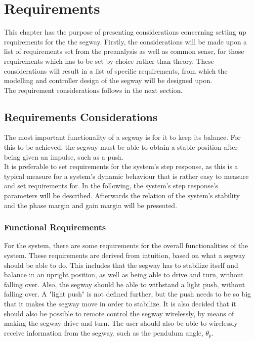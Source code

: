 \chapter{Requirements}
This chapter has the purpose of presenting considerations concerning setting up requirements for the the segway. Firstly, the considerations will be made upon a list of requirements set from the preanalysis as well as common sense, for those requirements which has to be set by choice rather than theory. These considerations will result in a list of specific requirements, from which the modelling and controller design of the segway will be designed upon. \\
The requirement considerations follows in the next section.
\section{Requirements Considerations}
The most important functionality of a segway is for it to keep its balance. For this to be achieved, the segway must be able to obtain a stable position after being given an impulse, such as a push. \\
It is preferable to set requirements for the system's step response, as this is a typical measure for a system's dynamic behaviour that is rather easy to measure and set requirements for. In the following, the system's step response's parameters will be described. Afterwards the relation of the system's stability and the phase margin and gain margin will be presented. 

\subsection{Functional Requirements}
For the system, there are some requirements for the overall functionalities of the system. These requirements are derived from intuition, based on what a segway should be able to do.
This includes that the segway has to stabilize itself and balance in an upright position, as well as being able to drive and turn, without falling over. Also, the segway should be able to withstand a light push, without falling over. A "light push" is not defined further, but the push needs to be so big that it makes the segway move in order to stabilize. 
It is also decided that it should also be possible to remote control the segway wirelessly, by means of making the segway drive and turn. The user should also be able to wirelessly receive information from the segway, such as the pendulum angle, $\theta_p$. 

